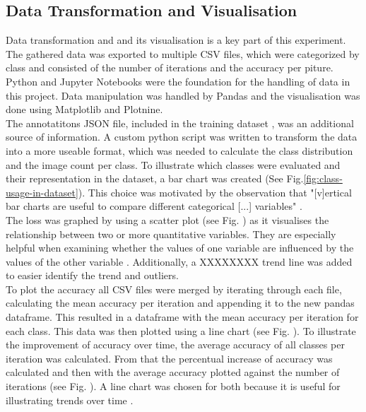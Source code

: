 \subsection{Data Transformation and Visualisation}
Data transformation and and its visualisation is a key part of this experiment. The gathered data was exported to multiple CSV files, 
which were categorized by class and consisted of the number of iterations and the accuracy per piture. Python and Jupyter Notebooks were the
foundation for the handling of data in this project. Data manipulation was handled by Pandas and the visualisation was done using Matplotlib
and Plotnine.\\
The annotatitons JSON file, included in the training dataset \parencite{pascal2023}, was an additional source of information. 
A custom python script was written to transform the data into a more useable format, which was needed to calculate the class distribution 
and the image count per class. To illustrate which classes were evaluated and their representation in the dataset, a bar chart was created 
(See Fig.\ref{fig:class-usage-in-dataset}). This choice was motivated by the observation that "[v]ertical bar charts are useful to compare 
different categorical [...] variables" \parencite{Statistics-Canada2021}.\\
The loss was graphed by using a scatter plot (see Fig. %
) as it visualises the relationship between two or more quantitative variables. They are especially helpful when examining whether
the values of one variable are influenced by the values of the other variable \parencite{Statistics-Canada2021b}. 
Additionally, a XXXXXXXX trend line was added to easier identify the trend and outliers.\\
To plot the accuracy all CSV files were merged by iterating through each file, calculating the mean accuracy per iteration and appending it
to the new pandas dataframe. This resulted in a dataframe with the mean accuracy per iteration for each class. This data was then plotted using
a line chart (see Fig. %
).
To illustrate the improvement of accuracy over time, the average accuracy of all classes per iteration was calculated.
From that the percentual increase of accuracy was calculated and then with the average accuracy plotted against the number of iterations (see Fig. %
).
A line chart was chosen for both because it is useful for illustrating trends over time \parencite{Statistics-Canada2021a}.\\

